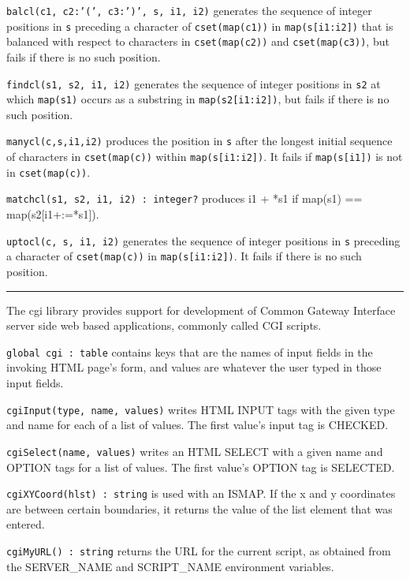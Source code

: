 \texttt{balcl(c1, c2:'(',
c3:')', s, i1, i2)} generates the
sequence of integer positions in \texttt{s} preceding a character of
\texttt{cset(map(c1))} in \texttt{map(s[i1:i2])} that is balanced with
respect to characters in \texttt{cset(map(c2))} and
\texttt{cset(map(c3))}, but fails if there is no such position.

\texttt{findcl(s1, s2, i1, i2)} generates the sequence of integer
positions in \texttt{s2} at which \texttt{map(s1)} occurs as a
substring in \texttt{map(s2[i1:i2])}, but fails if there is no such
position.

\texttt{manycl(c,s,i1,i2)} produces the position in \texttt{s} after the
longest initial sequence of characters in \texttt{cset(map(c))} within
\texttt{map(s[i1:i2])}. It fails if \texttt{map(s[i1])} is not in
\texttt{cset(map(c))}.

\texttt{matchcl(s1, s2, i1, i2) : integer?} produces i1 + *s1 if map(s1)
== map(s2[i1+:=*s1]).

\texttt{uptocl(c, s, i1, i2)} generates the sequence of integer
positions in \texttt{s} preceding a character of \texttt{cset(map(c))}
in \texttt{map(s[i1:i2])}. It fails if there is no such position.

\vspace{0.25cm}\hrule{}

The cgi library provides support for development of Common Gateway
Interface server side web based applications, commonly called
CGI scripts.

\texttt{global cgi : table} contains keys that are
the names of input fields in the invoking HTML page's
form, and values are whatever the user typed in those input fields. 

\texttt{cgiInput(type, name, values)} writes HTML INPUT tags
with the given type and name for each of a list of
values. The first value's input tag is CHECKED. 

\texttt{cgiSelect(name, values)} writes an HTML SELECT with a
given name and OPTION tags for a list of
values. The first value's OPTION tag is SELECTED. 

\texttt{cgiXYCoord(hlst) : string} is used with an ISMAP.
If the x and y coordinates are between certain boundaries, it returns
the value of the list element that was entered. 

\texttt{cgiMyURL() : string} returns the URL for the current script, as
obtained from the SERVER\_NAME and SCRIPT\_NAME environment variables. 

